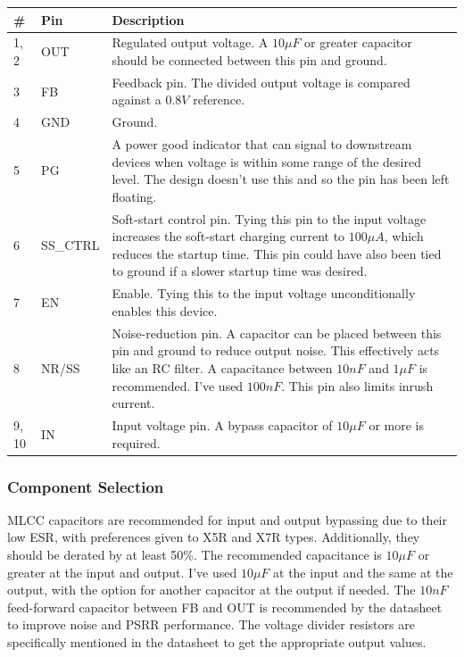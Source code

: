 \label{sec:tps7a91-pinout}
\begin{tabularx}{\textwidth}{l l X}
        \caption{TPS7A91 pinout.} \\
        \toprule
        \# & Pin & Description \\
        \midrule
        1, 2 & OUT & Regulated output voltage. A $10 \si{\mu F}$ or greater
        capacitor should be
        connected between this pin and ground. \\
        3 & FB & Feedback pin. The divided output voltage is compared against a $0.8 \si{V}$
        reference. \\
        4 & GND & Ground. \\
        5 & PG & A power good indicator that can signal to downstream devices when voltage is within
        some range of the desired level. The design doesn't use this and so the pin has been left
        floating. \\
        6 & SS\_CTRL & Soft-start control pin. Tying this pin to the input voltage increases the
        soft-start charging current to $100 \si{\mu A}$, which reduces the startup time. This pin
        could have also been tied to ground if a slower startup time was desired. \\
        7 & EN & Enable. Tying this to the input voltage unconditionally enables this device. \\
        8 & NR/SS & Noise-reduction pin. A capacitor can be placed between this pin and ground
        to reduce output noise. This effectively acts like an RC filter. A capacitance between $10
        \si{nF}$ and $1 \si{\mu F}$ is recommended. I've used $100 \si{nF}$. This pin also limits
        inrush current. \\
        9, 10 & IN & Input voltage pin. A bypass capacitor of $10 \si{\mu F}$ or more is
        required. \\
        \bottomrule
\end{tabularx}

\subsubsection{Component Selection}
\label{sec:tps7a91-component-selection}

MLCC capacitors are recommended for input and output bypassing due to their low ESR, with
preferences given to X5R and X7R types. Additionally, they should be derated by at least 50\%. The
recommended capacitance is $10 \si{\mu F}$ or greater at the input and output. I've used
$10 \si{\mu F}$ at the input and the same at the output, with the option for another capacitor at
the output if needed. The $10 \si{nF}$ feed-forward capacitor between FB and OUT is recommended by
the datasheet to improve noise and PSRR performance. The voltage divider resistors are specifically
mentioned in the datasheet to get the appropriate output values.

